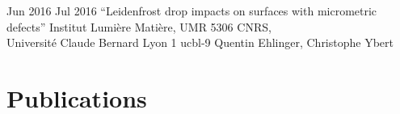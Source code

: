 \documentclass[a4paper]{cvtemplate_en} %
\begin{document}
\begin{cvbody}
\cvitem
	{Jun 2016}
	{Jul 2016}
	{``Leidenfrost drop impacts on surfaces with micrometric defects''}
	{Institut Lumi\`ere Mati\`ere, UMR 5306 CNRS,\\
	Universit\'e Claude Bernard Lyon 1 }
	{ucbl}{}{-9}
	{Quentin Ehlinger, Christophe Ybert}
 	{\\
 	}

\end{cvbody}


\section{Publications}

\begin{cvbody}

\parbox[t]{\textwidth}{

\begin{refsection}
\nocite{*}
\setlength\bibitemsep{-5pt}
\printbibliography[heading=empty]
\end{refsection}

}

\end{cvbody}

\newpage 

% 
% 
% 
% 

\end{document}
